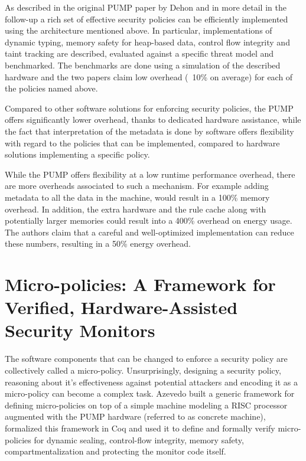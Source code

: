 As described in the original PUMP paper by Dehon \ETAL \cite{pump_hasp2014} and 
in more detail in the follow-up \cite{pump_ccs2014} a rich set of effective 
security policies can be efficiently implemented using the architecture 
mentioned above. In particular, implementations of dynamic typing, memory safety
for heap-based data, control flow integrity and taint tracking are described, 
evaluated against a specific threat model and benchmarked. The benchmarks are
done using a simulation of the described hardware and the two papers claim low
overhead (~10\% on average) for each of the policies named above.

Compared to other software solutions for enforcing security policies, the PUMP 
offers  significantly lower overhead, thanks to dedicated hardware assistance, 
while the fact that interpretation of the metadata is done by software offers 
flexibility with regard to the policies that can be implemented, compared to 
hardware solutions implementing a specific policy.

While the PUMP offers flexibility at a low runtime performance overhead, 
there are more overheads associated to such a mechanism. For example adding 
metadata to all the data in the machine, would result in a 100\% memory overhead.
In addition, the extra hardware and the rule cache along with potentially larger
memories could result into a 400\% overhead on energy usage. \cite{pump_ccs2014}
The authors claim that a careful and well-optimized implementation can reduce 
these numbers, resulting in a 50\% energy overhead.

\section{Micro-policies: A Framework for Verified, Hardware-Assisted Security 
Monitors}\label{sec:micropolicies}

The software components that can be changed to enforce a security policy
are collectively called a micro-policy.
Unsurprisingly, designing a security policy, reasoning about it's effectiveness 
against potential attackers and encoding it as a micro-policy can become a 
complex task. Azevedo \ETAL \cite{pump_popl2015} built a generic framework for
defining micro-policies on top of a simple machine modeling a RISC processor 
augmented with the PUMP hardware (referred to as concrete machine), formalized
this framework in Coq and used it to define and formally verify micro-policies
for dynamic sealing, control-flow integrity, memory safety, compartmentalization
and protecting the monitor code itself.

